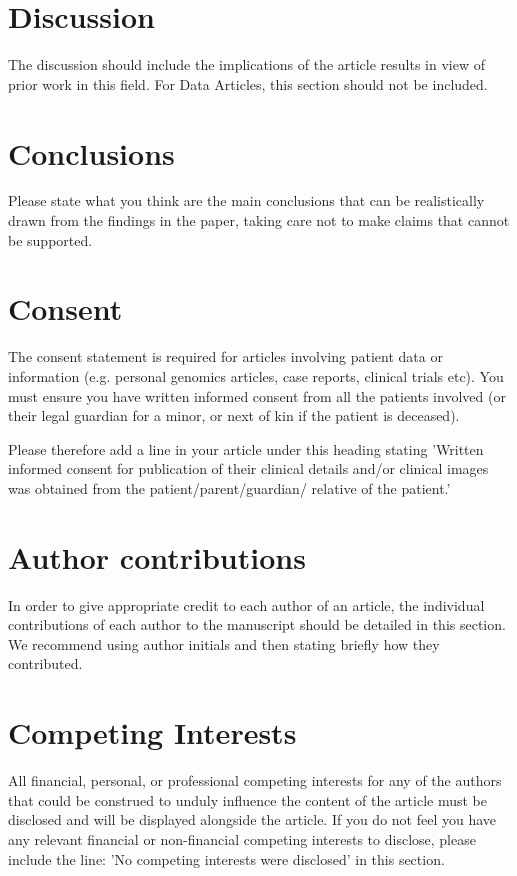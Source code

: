 \documentclass[10pt]{article}
\begin{document}
\section*{Discussion}
The discussion should include the implications of the article results in view of prior work in this field.
For Data Articles, this section should not be included. 


\section*{Conclusions}
Please state what you think are the main conclusions that can be realistically drawn from the findings in the paper, taking care not to make claims that cannot be supported.

\section*{Consent}
The consent statement is required for articles involving patient data or information (e.g. personal genomics articles, case reports, clinical trials etc). You must ensure you have written informed consent from all the patients involved (or their legal guardian for a minor, or next of kin if the patient is deceased).

Please therefore add a line in your article under this heading stating 'Written informed consent for publication of their clinical details and/or clinical images was obtained from the patient/parent/guardian/ relative of the patient.'

\section*{Author contributions}
In order to give appropriate credit to each author of an article, the individual contributions of each author to the manuscript should be detailed in this section. We recommend using author initials and then stating briefly how they contributed.

\section*{Competing Interests}
All financial, personal, or professional competing interests for any of the authors that could be construed to unduly influence the content of the article must be disclosed and will be displayed alongside the article.
If you do not feel you have any relevant financial or non-financial competing interests to disclose, please include the line: 'No competing interests were disclosed' in this section. 
\end{document}
